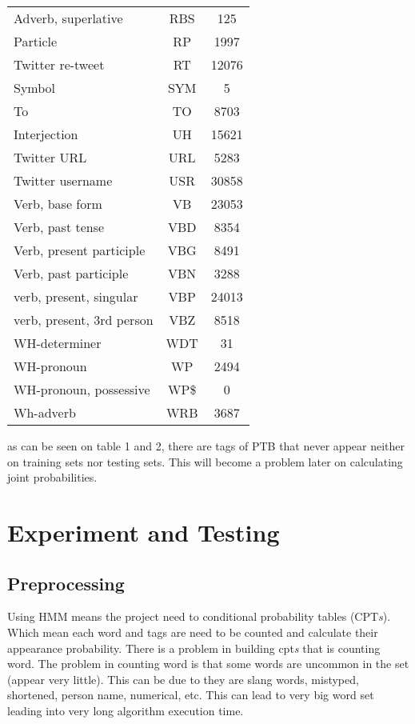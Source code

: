 \documentclass[conference,compsoc]{IEEEtran}
\begin{document}
\begin{center}
\begin{tabular}{|l|c|c|}
			Adverb, superlative & RBS & 125 \\
			Particle & RP & 1997 \\
			Twitter re-tweet & RT & 12076 \\
			Symbol & SYM & 5 \\
			To & TO & 8703 \\
			Interjection & UH & 15621 \\
			Twitter URL & URL & 5283 \\
			Twitter username & USR & 30858 \\
			Verb, base form & VB & 23053 \\
			Verb, past tense &VBD & 8354 \\
			Verb, present participle & VBG & 8491 \\
			Verb, past participle & VBN & 3288 \\
			verb, present, singular & VBP & 24013 \\
			verb, present, 3rd person & VBZ & 8518 \\
			WH-determiner & WDT & 31 \\
			WH-pronoun & WP & 2494 \\
			WH-pronoun, possessive & WP\$ & 0 \\
			Wh-adverb & WRB & 3687 \\
		\hline	
	\end{tabular} 
\end{center}

as can be seen on table 1 and 2, there are tags of PTB that never appear neither on training sets nor testing sets. This will become a problem later on calculating joint probabilities.

\bigskip

\section{Experiment and Testing}
\subsection{Preprocessing}
Using HMM means the project need to conditional probability tables (CPT\emph{s}). Which mean each word and tags are need to be counted and calculate their appearance probability. There is a problem in building cpt\emph{s} that is counting word. The problem in counting word is that some words are uncommon in the set (appear very little). This can be due to they are slang words, mistyped, shortened, person name, numerical, etc. This can lead to very big word set leading into very long algorithm execution time. 
\end{document}
